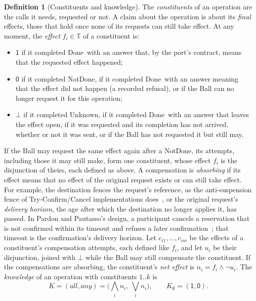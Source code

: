 \documentclass[11pt]{article}
\theoremstyle{definition}
\newtheorem{definition}{Definition}
\theoremstyle{plain}
\newcommand{\Done}{\textsf{Done}}
\newcommand{\NotDone}{\textsf{NotDone}}
\newcommand{\Unknown}{\textsf{Unknown}}
\newcommand{\yes}{\mathsf{1}}
\newcommand{\no}{\mathsf{0}}
\newcommand{\mayb}{\bot}
\begin{document}
\begin{definition}[Constituents and knowledge]
\label{def:knowledge}
The \emph{constituents} of an operation are the calls it needs, requested or not. A claim about the operation is about its \emph{final} effects, those that hold once none of its requests can still take effect. At any moment, the \emph{effect} $f_i \in \mathbb{T}$ of a constituent is:
\begin{itemize}[nosep]
  \item $\yes$ if it completed \Done\ with an answer that, by the port's contract, means that the requested effect happened;
  \item $\no$ if it completed \NotDone, if it completed \Done\ with an answer meaning that the effect did not happen (a recorded refusal), or if the Ball can no longer request it for this operation;
  \item $\mayb$ if it completed \Unknown, if it completed \Done\ with an answer that leaves the effect open, if it was requested and its completion has not arrived, whether or not it was sent, or if the Ball has not requested it but still may.
\end{itemize}
If the Ball may request the same effect again after a \NotDone, its attempts, including those it may still make, form one constituent, whose effect $f_i$ is the disjunction of theirs, each defined as above.
A compensation is \emph{absorbing} if its effect means that no effect of the original request exists or can still take effect. For example, the destination fences the request's reference, as the anti-suspension fence of Try-Confirm/\allowbreak Cancel implementations does~\citep{SeataTCCFence}, or the original request's \emph{delivery horizon}, the age after which the destination no longer applies it, has passed. In Pardon and Pautasso's design, a participant cancels a reservation that is not confirmed within its timeout and refuses a later confirmation~\citep{PardonPautasso2014TCC}; that timeout is the confirmation's delivery horizon. Let $c_{i1},\dots,c_{im}$ be the effects of a constituent's compensation attempts, each defined like $f_i$, and let $u_i$ be their disjunction, joined with $\mayb$ while the Ball may still compensate the constituent. If the compensations are absorbing, the constituent's \emph{net effect} is $n_i = f_i \wedge \neg u_i$. The \emph{knowledge} of an operation with constituents $1..k$ is
\[ K = (\textit{all}, \textit{any}) = \Big(\bigwedge_{i} n_i,\ \bigvee_{i} n_i\Big), \qquad K_\emptyset = (\yes,\no). \]
\end{definition}
\end{document}
